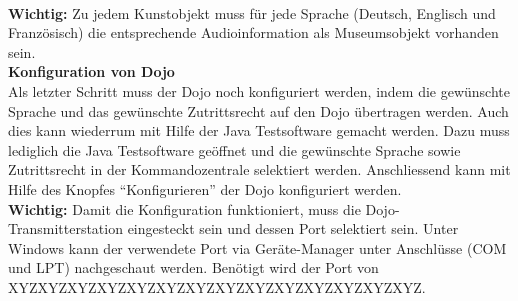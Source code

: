 \\[4mm]
\textbf{Wichtig:} Zu jedem Kunstobjekt muss für jede Sprache (Deutsch, Englisch und Französisch) die entsprechende Audioinformation als Museumsobjekt vorhanden sein.
\\[4mm]
\textbf{Konfiguration von Dojo}
\\[4mm]
Als letzter Schritt muss der Dojo noch konfiguriert werden, indem die gewünschte Sprache und das gewünschte Zutrittsrecht auf den Dojo übertragen werden. Auch dies kann wiederrum mit Hilfe der Java Testsoftware gemacht werden. Dazu muss lediglich die Java Testsoftware geöffnet und die gewünschte Sprache sowie Zutrittsrecht in der Kommandozentrale selektiert werden. Anschliessend kann mit Hilfe des Knopfes ``Konfigurieren'' der Dojo konfiguriert werden.
\\[4mm]
\textbf{Wichtig:} Damit die Konfiguration funktioniert, muss die Dojo-Transmitterstation eingesteckt sein und dessen Port selektiert sein. Unter Windows kann der verwendete Port via Geräte-Manager unter Anschlüsse (COM und LPT) nachgeschaut werden. Benötigt wird der Port von XYZXYZXYZXYZXYZXYZXYZXYZXYZXYZXYZXYZXYZXYZ.